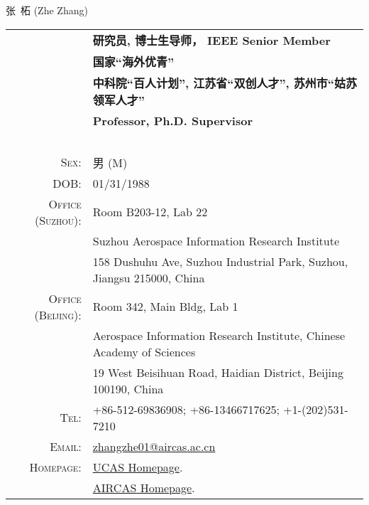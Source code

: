 \documentclass[paper=a4,fontsize=11pt]{scrartcl}
\newcommand{\sepspace}{\vspace*{1em}}		%
\newcommand{\MyName}[1]{
		\Huge \usefont{OT1}{phv}{b}{n} \hfill #1 		%
		\par \normalsize \normalfont}
\newcommand{\MySlogan}[1]{
		\large \usefont{OT1}{phv}{m}{n}\hfill \textit{#1} %
		\par \normalsize \normalfont}
\begin{document}

\MyName{张~柘 (Zhe Zhang)}

\sepspace


\begin{tabular}{rl}
	& \textbf{研究员, 博士生导师， IEEE Senior Member} \\
	& \textbf{国家``海外优青''} \\
	& \textbf{中科院``百人计划'', 江苏省``双创人才'', 苏州市``姑苏领军人才''} \\
	& \textbf{Professor, Ph.D. Supervisor} \\
	~&~\\
\textsc{Sex:} & 男 (M) \\
\textsc{DOB:} & 01/31/1988 \\
\textsc{Office (Suzhou):} &  Room B203-12, Lab 22 \\
	& Suzhou Aerospace Information Research Institute \\
	& 158 Dushuhu Ave, Suzhou Industrial Park, Suzhou, Jiangsu 215000, China \\
\textsc{Office (Beijing):}	&  Room 342, Main Bldg, Lab 1 \\
	& Aerospace Information Research Institute, Chinese Academy of Sciences \\
	& 19 West Beisihuan Road, Haidian District, Beijing 100190, China \\
\textsc{Tel:} & +86-512-69836908; +86-13466717625; +1-(202)531-7210\\
\textsc{Email:} & \href{mailto:zhangzhe01@aircas.ac.cn}{zhangzhe01@aircas.ac.cn} \\
\textsc{Homepage:} & \href{https://people.ucas.ac.cn/~zhe}{UCAS Homepage}. \\
	& \href{http://www.aircas.cas.cn/sourcedb_air_cas/cn/expert/yjy/202308/t20230803_6853650.html}{AIRCAS Homepage}.
\end{tabular}

\end{document}

